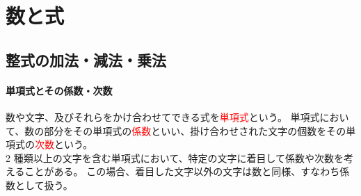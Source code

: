 \chapter{数と式}
\section{整式の加法・減法・乗法}
\subsubsection{単項式とその係数・次数}
数や文字、及びそれらをかけ合わせてできる式を\textcolor{red}{単項式}という。
単項式において、数の部分をその単項式の\textcolor{red}{係数}といい、掛け合わせされた文字の個数をその単項式の\textcolor{red}{次数}という。\\

2 種類以上の文字を含む単項式において、特定の文字に着目して係数や次数を考えることがある。
この場合、着目した文字以外の文字は数と同様、すなわち係数として扱う。
